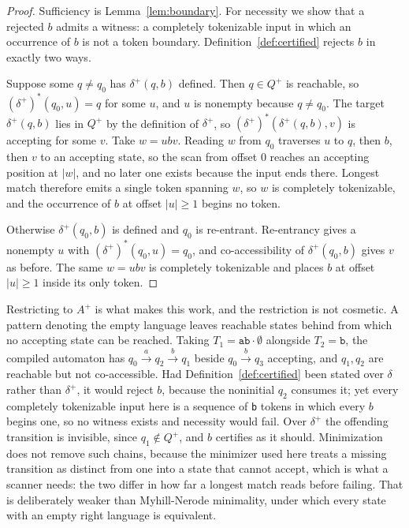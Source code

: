 \documentclass[11pt,a4paper]{article}
\theoremstyle{definition}
\theoremstyle{plain}
\newcommand{\code}[1]{\texttt{#1}}
\begin{document}
\begin{proof}
Sufficiency is Lemma~\ref{lem:boundary}. For necessity we show that a rejected $b$ admits a witness: a completely
tokenizable input in which an occurrence of $b$ is not a token boundary. Definition~\ref{def:certified} rejects $b$ in
exactly two ways.

Suppose some $q \neq q_0$ has $\delta^+(q,b)$ defined. Then $q \in Q^+$ is reachable, so $(\delta^+)^*(q_0,u) = q$ for
some $u$, and $u$ is nonempty because $q \neq q_0$. The target $\delta^+(q,b)$ lies in $Q^+$ by the definition of
$\delta^+$, so $(\delta^+)^*(\delta^+(q,b), v)$ is accepting for some $v$. Take $w = ubv$. Reading $w$ from $q_0$
traverses $u$ to $q$, then $b$, then $v$ to an accepting state, so the scan from offset $0$ reaches an accepting
position at $|w|$, and no later one exists because the input ends there. Longest match therefore emits a single token
spanning $w$, so $w$ is completely tokenizable, and the occurrence of $b$ at offset $|u| \geq 1$ begins no token.

Otherwise $\delta^+(q_0,b)$ is defined and $q_0$ is re-entrant. Re-entrancy gives a nonempty $u$ with
$(\delta^+)^*(q_0,u) = q_0$, and co-accessibility of $\delta^+(q_0,b)$ gives $v$ as before. The same $w = ubv$ is
completely tokenizable and places $b$ at offset $|u| \geq 1$ inside its only token.
\end{proof}

Restricting to $A^+$ is what makes this work, and the restriction is not cosmetic. A pattern denoting the empty
language leaves reachable states behind from which no accepting state can be reached. Taking $T_1 =
\code{ab}\cdot\emptyset$ alongside $T_2 = \code{b}$, the compiled automaton has $q_0 \xrightarrow{a} q_2
\xrightarrow{b} q_1$ beside $q_0 \xrightarrow{b} q_3$ accepting, and $q_1, q_2$ are reachable but not co-accessible.
Had Definition~\ref{def:certified} been stated over $\delta$ rather than $\delta^+$, it would reject $b$, because the
noninitial $q_2$ consumes it; yet every completely tokenizable input here is a sequence of \code{b} tokens in which
every $b$ begins one, so no witness exists and necessity would fail. Over $\delta^+$ the offending transition is
invisible, since $q_1 \notin Q^+$, and $b$ certifies as it should. Minimization does not remove such chains, because
the minimizer used here treats a missing transition as distinct from one into a state that cannot accept, which is
what a scanner needs: the two differ in how far a longest match reads before failing. That is deliberately weaker than
Myhill-Nerode minimality, under which every state with an empty right language is equivalent.
\end{document}
